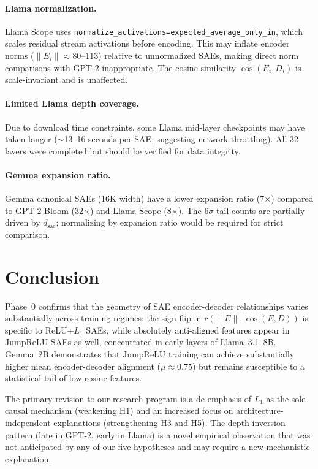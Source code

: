 \documentclass[11pt,a4paper]{article}
\newcommand{\cosED}{\cos(E_i, D_i)}
\newcommand{\rPearson}{r(\|E\|, \cos(E,D))}
\begin{document}
\paragraph{Llama normalization.} Llama Scope uses \texttt{normalize\_activations=expected\_average\_only\_in}, which scales residual stream activations before encoding. This may inflate encoder norms ($\|E_i\| \approx 80$--$113$) relative to unnormalized SAEs, making direct norm comparisons with GPT-2 inappropriate. The cosine similarity $\cosED$ is scale-invariant and is unaffected.

\paragraph{Limited Llama depth coverage.} Due to download time constraints, some Llama mid-layer checkpoints may have taken longer ($\sim$13--16 seconds per SAE, suggesting network throttling). All 32 layers were completed but should be verified for data integrity.

\paragraph{Gemma expansion ratio.} Gemma canonical SAEs (16K width) have a lower expansion ratio (7$\times$) compared to GPT-2 Bloom (32$\times$) and Llama Scope (8$\times$). The $6\sigma$ tail counts are partially driven by $d_\text{sae}$; normalizing by expansion ratio would be required for strict comparison.

\section{Conclusion}
\label{sec:conclusion}

Phase~0 confirms that the geometry of SAE encoder-decoder relationships varies substantially across training regimes: the sign flip in $\rPearson$ is specific to ReLU$+L_1$ SAEs, while absolutely anti-aligned features appear in JumpReLU SAEs as well, concentrated in early layers of Llama~3.1~8B. Gemma~2B demonstrates that JumpReLU training can achieve substantially higher mean encoder-decoder alignment ($\mu \approx 0.75$) but remains susceptible to a statistical tail of low-cosine features.

The primary revision to our research program is a de-emphasis of $L_1$ as the sole causal mechanism (weakening H1) and an increased focus on architecture-independent explanations (strengthening H3 and H5). The depth-inversion pattern (late in GPT-2, early in Llama) is a novel empirical observation that was not anticipated by any of our five hypotheses and may require a new mechanistic explanation.
\end{document}
